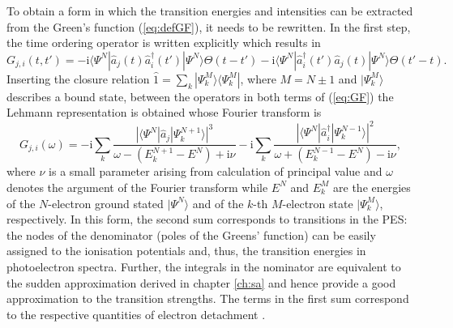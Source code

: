 To obtain a form in which the transition energies and intensities can be extracted from the Green's function (\ref{eq:defGF}), it needs to be rewritten.
In the first step, the time ordering operator is written explicitly which results in 
\begin{equation} \label{eq:GF}
G_{j,i}(t,t')= -\text{i}\langle \Psi^N | \hat{a}_j(t)\hat{a}^\dagger_i(t') |\Psi^N\rangle \Theta(t-t') -
                   \text{i} \langle \Psi^N | \hat{a}^\dagger_i(t')\hat{a}_j(t) |\Psi^N\rangle \Theta(t'-t).
\end{equation}
Inserting the closure relation $\hat{1}=\sum_k |\Psi^M_k\rangle\langle \Psi^M_k |$, where $M=N\pm 1$ and $|\Psi^M_k\rangle$ describes a bound state, between the operators in both terms of (\ref{eq:GF}) the Lehmann representation \cite{bookGF} is obtained whose Fourier transform is
\begin{equation}\label{eq:gfSpect}
G_{j,i}(\omega)=-\text{i} \sum_k\frac{\left|\langle \Psi^N | \hat{a}_j|\Psi^{N+1}_k \rangle \right|^3}{\omega-(E_k^{N+1}-E^N)+\text{i}\nu}-
                \text{i}\sum_k\frac{\left|\langle \Psi^N | \hat{a}^\dagger_i|\Psi^{N-1}_k \rangle \right|^2}{\omega+(E_k^{N-1}-E^N)-\text{i}\nu},
\end{equation}
where $\nu$ is a small parameter arising from calculation of principal value and $\omega$ denotes the argument of the Fourier transform while $E^N$ and $E_k^M$ are the energies of the $N$-electron ground stated $|\Psi^N\rangle$ and of the $k$-th $M$-electron state $|\Psi_k^M\rangle$, respectively.
In this form, the second sum corresponds to transitions in the PES: the nodes of the denominator (poles of the Greens' function) can be easily assigned to the ionisation potentials and, thus, the transition energies in photoelectron spectra.
Further, the integrals in the nominator are equivalent to the sudden approximation derived in chapter \ref{ch:sa} and hence provide a good approximation to the transition strengths.
The terms in the first sum correspond to the respective quantities of electron detachment \cite{1pGFcederbaum}.

